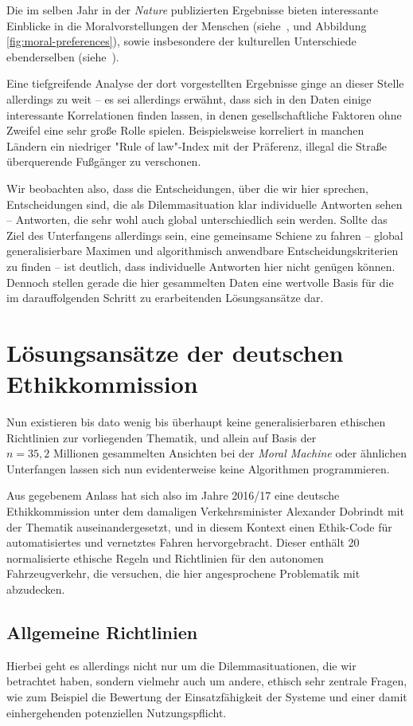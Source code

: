 \documentclass[twocolumn, german]{tum-article}
\begin{document}
Die im selben Jahr in der \emph{Nature} publizierten Ergebnisse bieten interessante Einblicke in die Moralvorstellungen der Menschen (siehe~\cite[S. 61]{moral-machine}, und Abbildung \vref{fig:moral-preferences}), sowie insbesondere der kulturellen Unterschiede ebenderselben (siehe~\cite[S. 62]{moral-machine}).

Eine tiefgreifende Analyse der dort vorgestellten Ergebnisse ginge an dieser Stelle allerdings zu weit -- es sei allerdings erwähnt, dass sich in den Daten einige interessante Korrelationen finden lassen, in denen gesellschaftliche Faktoren ohne Zweifel eine sehr große Rolle spielen.
Beispielsweise korreliert in manchen Ländern ein niedriger "Rule of law"-Index mit der Präferenz, illegal die Straße überquerende Fußgänger zu verschonen.

Wir beobachten also, dass die Entscheidungen, über die wir hier sprechen, Entscheidungen sind, die als Dilemmasituation klar individuelle Antworten sehen -- Antworten, die sehr wohl auch global unterschiedlich sein werden.
Sollte das Ziel des Unterfangens allerdings sein, eine gemeinsame Schiene zu fahren -- global generalisierbare Maximen und algorithmisch anwendbare Entscheidungskriterien zu finden -- ist deutlich, dass individuelle Antworten hier nicht genügen können. Dennoch stellen gerade die hier gesammelten Daten eine wertvolle Basis für die im darauffolgenden Schritt zu erarbeitenden Lösungsansätze dar.


\section{Lösungsansätze der deutschen Ethikkommission}
Nun existieren bis dato wenig bis überhaupt keine generalisierbaren ethischen Richtlinien zur vorliegenden Thematik, und allein auf Basis der $n = 35,2\,\,\text{Millionen}$ gesammelten Ansichten bei der \emph{Moral Machine} oder ähnlichen Unterfangen lassen sich nun evidenterweise keine Algorithmen programmieren.

Aus gegebenem Anlass hat sich also im Jahre 2016/17 eine deutsche Ethikkommission unter dem damaligen Verkehrsminister Alexander Dobrindt mit der Thematik auseinandergesetzt, und in diesem Kontext einen Ethik-Code für automatisiertes und vernetztes Fahren hervorgebracht.
Dieser enthält 20 normalisierte ethische Regeln und Richtlinien für den autonomen Fahrzeugverkehr, die versuchen, die hier angesprochene Problematik mit abzudecken.


\subsection{Allgemeine Richtlinien}
Hierbei geht es allerdings nicht nur um die Dilemmasituationen, die wir betrachtet haben, sondern vielmehr auch um andere, ethisch sehr zentrale Fragen, wie zum Beispiel die Bewertung der Einsatzfähigkeit der Systeme und einer damit einhergehenden potenziellen Nutzungspflicht.
\end{document}

